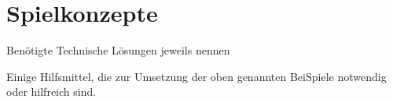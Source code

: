 \chapter{Spielkonzepte}

{\color{red}Benötigte Technische Lösungen jeweils nennen}

Einige Hilfsmittel, die zur Umsetzung der oben genannten BeiSpiele notwendig oder
hilfreich sind.




















\newpage